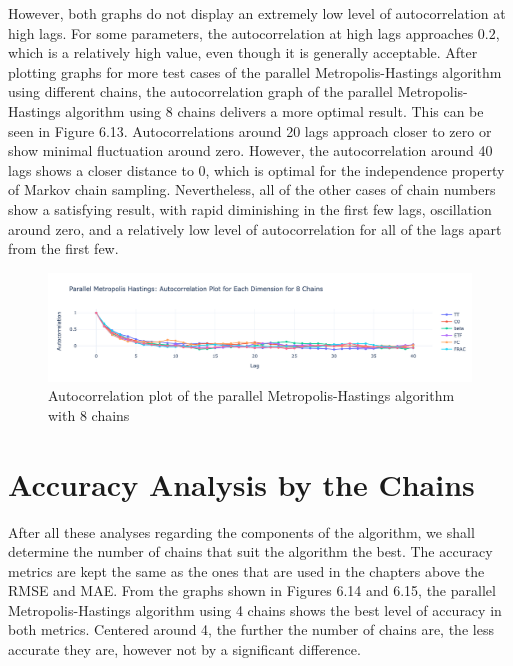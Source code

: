 However, both graphs do not display an extremely low level of autocorrelation at high lags. For some parameters, the autocorrelation at high lags approaches $0.2$, which is a relatively high value, even though it is generally acceptable. After plotting graphs for more test cases of the parallel Metropolis-Hastings algorithm using different chains, the autocorrelation graph of the parallel Metropolis-Hastings algorithm using 8 chains delivers a more optimal result. This can be seen in Figure 6.13. Autocorrelations around 20 lags approach closer to zero or show minimal fluctuation around zero. However, the autocorrelation around 40 lags shows a closer distance to 0, which is optimal for the independence property of Markov chain sampling. Nevertheless, all of the other cases of chain numbers show a satisfying result, with rapid diminishing in the first few lags, oscillation around zero, and a relatively low level of autocorrelation for all of the lags apart from the first few.


\begin{figure}[H]
    \centering
    \includegraphics[width=1\textwidth]{figures/parallel_mh/Autocorrelation_8.png}
    \captionsetup{width=.8\textwidth}
    \caption{Autocorrelation plot of the parallel Metropolis-Hastings algorithm with 8 chains}
    \label{fig:enter-label}
\end{figure}


\section{Accuracy Analysis by the Chains}
After all these analyses regarding the components of the algorithm, we shall determine the number of chains that suit the algorithm the best. The accuracy metrics are kept the same as the ones that are used in the chapters above the RMSE and MAE. From the graphs shown in Figures 6.14 and 6.15, the parallel Metropolis-Hastings algorithm using 4 chains shows the best level of accuracy in both metrics. Centered around 4, the further the number of chains are, the less accurate they are, however not by a significant difference.

